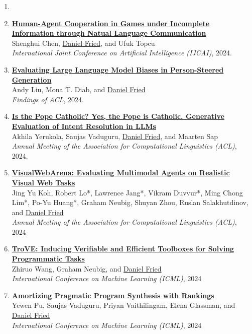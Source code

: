 \begin{enumerate}[leftmargin=-1mm,partopsep=0pt]
  \item[]

  \item \href{}{\textbf{Human-Agent Cooperation in Games under Incomplete Information through Natual Language Communication }} \\
    Shenghui Chen, \underline{Daniel Fried}, and Ufuk Topcu \\
    \emph{International Joint Conference on Artificial Intelligence (IJCAI)}, 2024.

  \item \href{}{\textbf{Evaluating Large Language Model Biases in Person-Steered Generation}} \\
    Andy Liu, Mona T. Diab, and \underline{Daniel Fried} \\
    \emph{Findings of ACL}, 2024.

  \item \href{https://arxiv.org/abs/2405.08760}{\textbf{Is the Pope Catholic? Yes, the Pope is Catholic. Generative Evaluation of Intent Resolution in LLMs}} \\
    Akhila Yerukola, Saujas Vaduguru, \underline{Daniel Fried}, and Maarten Sap \\
    \emph{Annual Meeting of the Association for Computational Linguistics (ACL)}, 2024.

  \item \href{https://arxiv.org/abs/2401.13649}{\textbf{VisualWebArena: Evaluating Multimodal Agents on Realistic Visual Web Tasks}}\\
    Jing Yu Koh, Robert Lo*, Lawrence Jang*, Vikram Duvvur*, Ming Chong Lim*, Po-Yu Huang*, Graham Neubig, Shuyan Zhou, Ruslan Salakhutdinov, and \underline{Daniel Fried} \\
    \emph{Annual Meeting of the Association for Computational Linguistics (ACL)}, 2024

  \item \href{https://arxiv.org/abs/2401.12869}{\textbf{TroVE: Inducing Verifiable and Efficient Toolboxes for Solving Programmatic Tasks}}\\
    Zhiruo Wang, Graham Neubig, and \underline{Daniel Fried} \\
    \emph{International Conference on Machine Learning (ICML)}, 2024

  \item \href{https://arxiv.org/abs/2309.03225}{\textbf{Amortizing Pragmatic Program Synthesis with Rankings}} \\
    Yewen Pu, Saujas Vaduguru, Priyan Vaithilingam, Elena Glassman, and \underline{Daniel Fried} \\
    \emph{International Conference on Machine Learning (ICML)}, 2024 


\end{enumerate}
